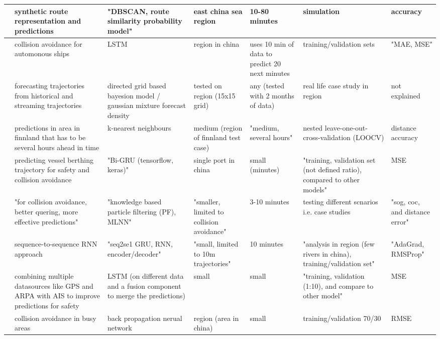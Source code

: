 \begin{sidewaystable}
{\begin{tabular}{|l|l|l|l|l|l|l|}
        \cite{Tafa2019AutomaticPrediction} & synthetic route representation and predictions & "DBSCAN, route similarity probability model" & east china sea region & 10-80 minutes & simulation & accuracy \\ \hline
        \cite{Tang2019ANetwork} & collision avoidance for automonous ships & LSTM & region in china & uses 10 min of data to predict 20 next minutes & training/validation sets & "MAE, MSE" \\ \hline
        \cite{Uney2019DataModels} & forecasting trajectories from historical and streaming trajectories & directed grid based bayesion model / gaussian mixture forecast density & tested on region (15x15 grid) & any (tested with 2 months of data) & real life case study in region & not explained \\ \hline
        \cite{Virjonen2018ShipMethod} & predictions in area in finnland that has to be several hours ahead in time & k-nearest neighbours & medium (region of finnland test case) & "medium, several hours" & nested leave-one-out-cross-validation (LOOCV) & distance accuracy \\ \hline
        \cite{Wang2020VesselGRU} & predicting vessel berthing trajectory for safety and collision avoidance & "Bi-GRU (tensorflow, keras)" & single port in china & small (minutes) & "training, validation set (not defined ratio), compared to other models" & MSE \\ \hline
        \cite{Xiao2020BigTechniques} & "for collision avoidance, better quering, more effective predictions" & "knowledge based particle filtering (PF), MLNN" & "smaller, limited to collision avoidance" & 3-10 minutes & testing different scnarios i.e. case studies & "sog, coc, and distance error" \\ \hline
        \cite{You2020ST-Seq2Seq:Prediction} & sequence-to-sequence RNN approach & "seq2se1 GRU, RNN, encoder/decoder" & "small, limited to 10m trajectories" & 10 minutes & "analysis in region (few rivers in china), training/validation set" & "AdaGrad, RMSProp" \\ \hline
        \cite{Zheng2020HeterogenousModeling} & combining multiple datasources like GPS and ARPA with AIS to improve predictions for safety & LSTM (on different data and a fusion component to merge the predictions) & small & small & "training, validation (1:10), and compare to other model" & MSE \\ \hline
        \cite{Zhou2019ShipNetwork} & collision avoidance in busy areas & back propagation nerual network & region (area in china) & small & training/validation 70/30 & RMSE \\ \hline
    \end{tabular}
    }
\end{sidewaystable}
